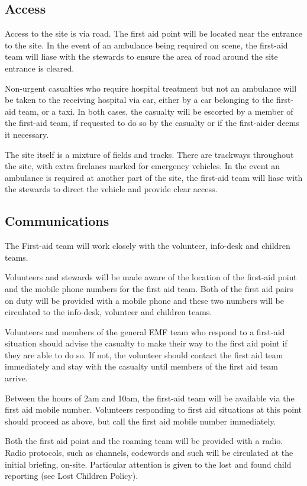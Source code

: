 \subsection{Access}

Access to the site is via road. The first aid point will be located near the
entrance to the site. In the event of an ambulance being required on scene, the
first-aid team will liase with the stewards to ensure the area of road around
the site entrance is cleared.

Non-urgent casualties who require hospital treatment but not an ambulance will
be taken to the receiving hospital via car, either by a car belonging to the
first-aid team, or a taxi. In both cases, the casualty will be escorted by a
member of the first-aid team, if requested to do so by the casualty or if the
first-aider deems it necessary.

The site itself is a mixture of fields and tracks. There are
trackways throughout the site, with extra firelanes marked for emergency
vehicles. In the event an ambulance is required at another part of the site,
the first-aid team will liase with the stewards to direct the vehicle and
provide clear access.

\subsection{Communications}

The First-aid team will work closely with the volunteer, info-desk and children
teams.

Volunteers and stewards will be made aware of the location of the first-aid
point and the mobile phone numbers for the first aid team. Both of the first
aid pairs on duty will be provided with a mobile phone and these two numbers
will be circulated to the info-desk, volunteer and children teams.

Volunteers and members of the general EMF team who respond to a first-aid
situation should advise the casualty to make their way to the first aid point
if they are able to do so. If not, the volunteer should contact the first aid
team immediately and stay with the casualty until members of the first aid team
arrive.

Between the hours of 2am and 10am, the first-aid team will be available via the
first aid mobile number. Volunteers responding to first aid situations at this
point should proceed as above, but call the first aid mobile number
immediately.

Both the first aid point and the roaming team will be provided with a radio.
Radio protocols, such as channels, codewords and such will be circulated at the
initial briefing, on-site. Particular attention is given to the lost and found
child reporting (see Lost Children Policy).

